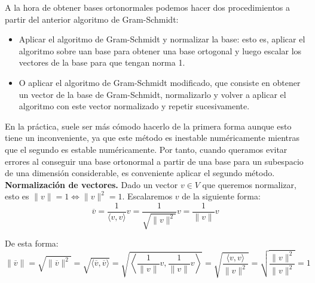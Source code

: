 \noindent
A la hora de obtener bases ortonormales podemos hacer dos procedimientos a partir del anterior algoritmo de Gram-Schmidt:
\begin{itemize}
    \item Aplicar el algoritmo de Gram-Schmidt y normalizar la base: esto es, aplicar el algoritmo sobre uan base para
          obtener una base ortogonal y luego escalar los vectores de la base para que tengan norma 1.
    \item O aplicar el algoritmo de Gram-Schmidt modificado, que consiste en obtener un vector de la base de Gram-Schmidt,
          normalizarlo y volver a aplicar el algoritmo con este vector normalizado y repetir sucesivamente.
\end{itemize}

\noindent
En la práctica, suele ser más cómodo hacerlo de la primera forma aunque esto tiene un inconveniente, ya que este
método es inestable numéricamente mientras que el segundo es estable numéricamente. Por tanto, cuando queramos evitar
errores al conseguir una base ortonormal a partir de una base para un subespacio de una dimensión considerable,
es conveniente aplicar el segundo método.\\

\noindent
\textbf{Normalización de vectores.} Dado un vector $v \in V$ que queremos normalizar, esto es $\|v\|=1 \Leftrightarrow \|v\|^2 = 1$.
Escalaremos $v$ de la siguiente forma:
$$\overline{v} = \dfrac{1}{\langle v,v \rangle}v = \dfrac{1}{\sqrt{\|v\|^2}}v = \dfrac{1}{\|v\|}v$$

De esta forma:
$$\|\overline{v}\| = \sqrt{\|\overline{v}\|^2} = \sqrt{\langle \overline{v},\overline{v} \rangle} =
    \sqrt{\left\langle \dfrac{1}{\|v\|}v,\dfrac{1}{\|v\|}v \right\rangle} = \sqrt{\dfrac{\langle v,v \rangle}{\|v\|^2}} =
    \sqrt{\dfrac{\|v\|^2}{\|v\|^2}} = 1$$

